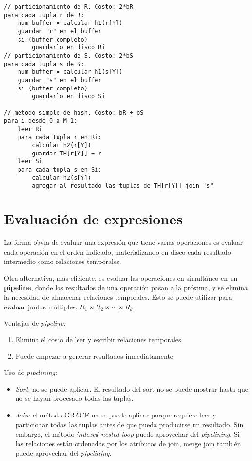 \documentclass[a4paper, twoside]{article}
\begin{document}
\begin{itemize}
	\begin{lstlisting}
// particionamiento de R. Costo: 2*bR
para cada tupla r de R:
	num buffer = calcular h1(r[Y])
	guardar "r" en el buffer
	si (buffer completo)
		guardarlo en disco Ri
// particionamiento de S. Costo: 2*bS
para cada tupla s de S:
	num buffer = calcular h1(s[Y])
	guardar "s" en el buffer
	si (buffer completo)
		guardarlo en disco Si

// metodo simple de hash. Costo: bR + bS
para i desde 0 a M-1:
	leer Ri
	para cada tupla r en Ri:
		calcular h2(r[Y])
		guardar TH[r[Y]] = r
	leer Si
	para cada tupla s en Si:
		calcular h2(s[Y])
		agregar al resultado las tuplas de TH[r[Y]] join "s"
	\end{lstlisting}
\end{itemize}

\section{Evaluación de expresiones}
La forma obvia de evaluar una expresión que tiene varias operaciones es evaluar cada operación en el orden indicado, materializando en disco cada resultado intermedio como relaciones temporales.

Otra alternativa, más eficiente, es evaluar las operaciones en simultáneo en un \textbf{pipeline}, donde los resultados de una operación pasan a la próxima, y se elimina la necesidad de almacenar relaciones temporales. Esto se puede utilizar para evaluar juntas múltiples: $R_{1}\bowtie R_{2}\bowtie\cdots\bowtie R_{k}$.

Ventajas de \emph{pipeline:}
\begin{enumerate}
	\item Elimina el costo de leer y escribir relaciones temporales.
	\item Puede empezar a generar resultados inmediatamente.
\end{enumerate}

Uso de \emph{pipelining}:
\begin{itemize}
	\item \emph{Sort}: no se puede aplicar. El resultado del sort no se puede mostrar hasta que no se hayan procesado todas las tuplas.
	\item \emph{Join}: el método GRACE no se puede aplicar porque requiere leer y particionar todas las tuplas antes de que pueda producirse un resultado. Sin embargo, el método \emph{indexed nested-loop} puede aprovechar del \emph{pipelining}. Si las relaciones están ordenadas por los atributos de join, merge join también puede aprovechar del \emph{pipelining}.
\end{itemize}
\end{document}
